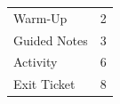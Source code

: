 \begin{tocbox}
\begin{tabularx}{\linewidth}{@{}X r@{}}
Warm-Up & 2 \\
Guided Notes & 3 \\
Activity & 6 \\
Exit Ticket & 8 \\
\end{tabularx}
\end{tocbox}
